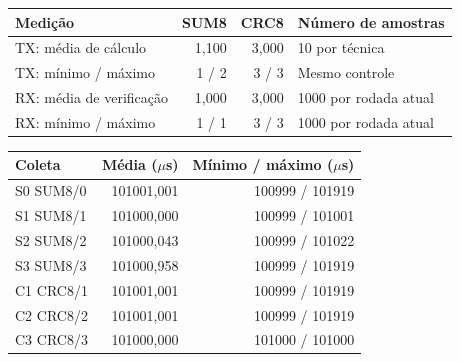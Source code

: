\documentclass[12pt,a4paper]{article}
\begin{document}
\par\smallskip\noindent\begin{minipage}{\textwidth}\centering\small
{}
\begin{tabularx}{\textwidth}{@{}Y r r P{.23\linewidth}@{}}\toprule
\textbf{Medição} & \textbf{SUM8} & \textbf{CRC8} & \textbf{Número de amostras}\\\midrule
TX: média de cálculo & 1,100 & 3,000 & 10 por técnica\\
TX: mínimo / máximo & 1 / 2 & 3 / 3 & Mesmo controle\\
RX: média de verificação & 1,000 & 3,000 & 1000 por rodada atual\\
RX: mínimo / máximo & 1 / 1 & 3 / 3 & 1000 por rodada atual\\
\bottomrule\end{tabularx}
\par{}\end{minipage}\par\smallskip


\par\smallskip\noindent\begin{minipage}{\textwidth}\centering\small
{}
\begin{tabularx}{\textwidth}{@{}Y r r@{}}\toprule
\textbf{Coleta} & \textbf{Média (\ensuremath{\mu}s)} & \textbf{Mínimo / máximo (\ensuremath{\mu}s)}\\\midrule
S0 SUM8/0 & 101001,001 & 100999 / 101919\\
S1 SUM8/1 & 101000,000 & 100999 / 101001\\
S2 SUM8/2 & 101000,043 & 100999 / 101022\\
S3 SUM8/3 & 101000,958 & 100999 / 101919\\
C1 CRC8/1 & 101001,001 & 100999 / 101919\\
C2 CRC8/2 & 101001,001 & 100999 / 101919\\
C3 CRC8/3 & 101000,000 & 101000 / 101000\\
\bottomrule\end{tabularx}
\par{}\end{minipage}\par\smallskip
\end{document}
